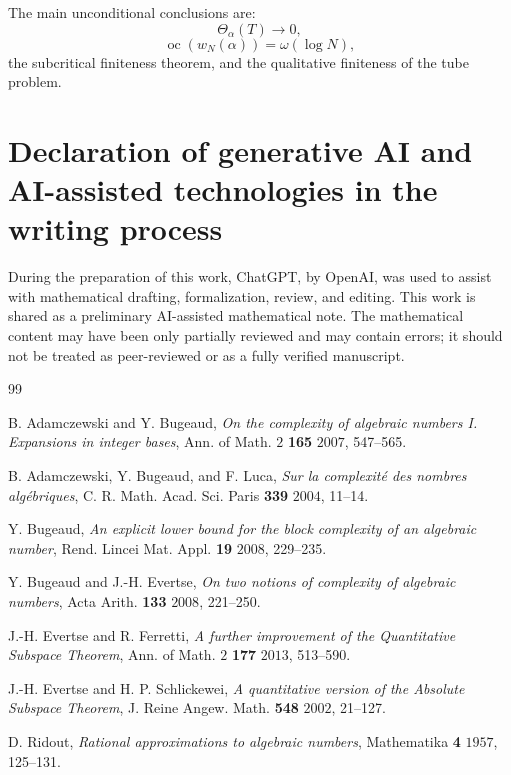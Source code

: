 \documentclass[11pt]{amsart}
\DeclareMathOperator{\oc}{oc}
\begin{document}
The main unconditional conclusions are:
\[
\Theta_\alpha(T)\to0,
\]
\[
\oc(w_N(\alpha))=\omega(\log N),
\]
the subcritical finiteness theorem, and the qualitative finiteness of the tube problem.

\section*{Declaration of generative AI and AI-assisted technologies in the writing process}

During the preparation of this work, ChatGPT, by OpenAI, was used to assist with mathematical drafting, formalization, review, and editing. This work is shared as a preliminary AI-assisted mathematical note. The mathematical content may have been only partially reviewed and may contain errors; it should not be treated as peer-reviewed or as a fully verified manuscript.

\begin{thebibliography}{99}

B. Adamczewski and Y. Bugeaud,
\emph{On the complexity of algebraic numbers I. Expansions in integer bases},
Ann. of Math. \(2\) \textbf{165} \(2007\), 547--565.

B. Adamczewski, Y. Bugeaud, and F. Luca,
\emph{Sur la complexité des nombres algébriques},
C. R. Math. Acad. Sci. Paris \textbf{339} \(2004\), 11--14.

Y. Bugeaud,
\emph{An explicit lower bound for the block complexity of an algebraic number},
Rend. Lincei Mat. Appl. \textbf{19} \(2008\), 229--235.

Y. Bugeaud and J.-H. Evertse,
\emph{On two notions of complexity of algebraic numbers},
Acta Arith. \textbf{133} \(2008\), 221--250.

J.-H. Evertse and R. Ferretti,
\emph{A further improvement of the Quantitative Subspace Theorem},
Ann. of Math. \(2\) \textbf{177} \(2013\), 513--590.

J.-H. Evertse and H. P. Schlickewei,
\emph{A quantitative version of the Absolute Subspace Theorem},
J. Reine Angew. Math. \textbf{548} \(2002\), 21--127.

D. Ridout,
\emph{Rational approximations to algebraic numbers},
Mathematika \textbf{4} \(1957\), 125--131.

\end{thebibliography}
\end{document}
